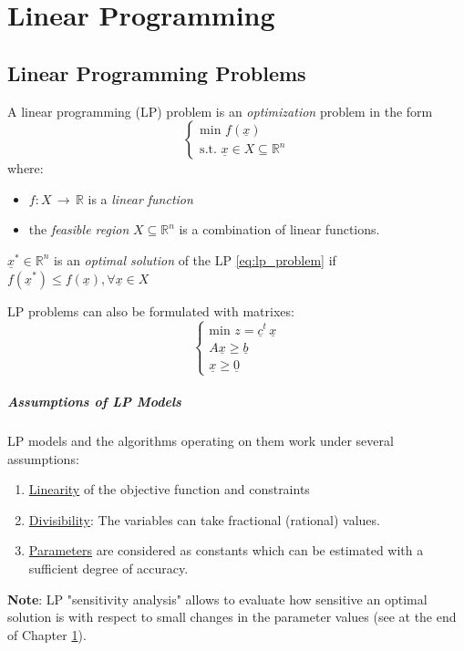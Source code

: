 \chapter{Linear Programming}\label{chap:lp}
    \section{Linear Programming Problems}
        A linear programming (LP) problem is an \textit{optimization} problem in the form
        \begin{equation}\label{eq:lp_problem}
            \begin{cases}
                \text{min } f(\underline{x})\\
                \text{s.t. } \underline{x} \in X \subseteq \mathbb{R}^n
            \end{cases}
        \end{equation}
        where:
        \begin{itemize}
            \item $f: X \,\rightarrow\, \mathbb{R}$ is a \textit{linear function}
            \item the \textit{feasible region} $X \subseteq \mathbb{R}^n$ is a combination of linear functions.
        \end{itemize}
        \begin{definition}
            $\underline{x}^* \in \mathbb{R}^n$ is an \emph{optimal solution} of the LP \eqref{eq:lp_problem} if $f(\underline{x}^*) \leq f(\underline{x}), \forall \underline{x} \in X$
        \end{definition}
        LP problems can also be formulated with matrixes:
        \begin{equation}
            \begin{cases}
                \text{min } z = \underline{c}^t\, \underline{x}\\
                A\underline{x} \geq \underline{b}\\
                \underline{x} \geq \underline{0}
            \end{cases}
        \end{equation}

        \paragraph{Assumptions of LP Models}
            LP models and the algorithms operating on them work under several assumptions:
            \begin{enumerate}
                \item \underline{Linearity} of the objective function and constraints
                \item \underline{Divisibility}: The variables can take fractional (rational) values.
                \item \underline{Parameters} are considered as constants which can be estimated with a sufficient degree of accuracy.
            \end{enumerate}
        \textbf{Note}: LP "sensitivity analysis" allows to evaluate how sensitive an optimal solution is
        with respect to small changes in the parameter values (see at the end of Chapter \ref{chap:lp}).
